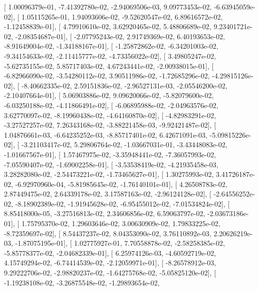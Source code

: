 \documentclass{article}
\begin{document}
       [  1.00096379e-01,  -7.41392780e-02,  -2.94069506e-03,
          9.09773453e-02,  -6.63945059e-02],
       [  1.05115265e-01,   1.94093606e-02,  -9.52620547e-02,
          6.89616572e-02,  -1.12458839e-01],
       [  4.79910610e-02,   3.62920465e-02,   5.48806689e-02,
          9.23401721e-02,  -2.08354687e-01],
       [ -2.07795243e-02,   2.91749369e-02,   6.40193653e-02,
         -8.91649004e-02,  -1.34188167e-01],
       [ -1.25872862e-02,  -6.34201003e-02,  -9.34154633e-02,
         -2.11415777e-02,  -4.73356022e-02],
       [  3.49805247e-02,  -5.62735155e-02,   5.85717403e-02,
          4.67243441e-02,  -2.00938015e-01],
       [ -6.82966090e-02,  -3.54280112e-02,   3.90511986e-02,
         -1.72685296e-02,  -4.29815126e-02],
       [ -8.40662335e-02,   2.59151836e-02,  -2.96527131e-03,
         -2.05546200e-02,  -2.10407664e-01],
       [  5.06903886e-02,   9.09620066e-02,  -5.82079600e-02,
         -6.03250188e-02,  -4.11866491e-02],
       [ -6.06895988e-02,  -2.04963576e-02,   3.62770097e-02,
         -8.19960438e-02,  -4.64160870e-02],
       [ -4.82983291e-02,  -3.27527257e-02,   7.26343168e-02,
         -3.88221458e-03,  -9.92421487e-02],
       [  1.04876661e-03,  -6.64235252e-03,  -8.85717401e-02,
          6.42671091e-03,  -5.09815226e-02],
       [ -3.21103417e-02,   5.29806764e-02,  -1.03667031e-01,
         -3.43448083e-02,  -1.01667567e-01],
       [  1.57467975e-02,  -3.35948441e-02,  -7.36057993e-02,
         -7.05590407e-02,  -1.69002258e-01],
       [ -3.53538419e-02,  -4.21935458e-03,   3.28282080e-02,
         -2.54473221e-02,  -1.73465627e-01],
       [  1.30275993e-02,   3.41726187e-02,  -6.92970960e-04,
         -5.81985645e-02,  -1.76140101e-01],
       [  4.26508783e-02,   2.87449475e-02,   2.64339178e-02,
          3.17587163e-02,  -2.96124128e-02],
       [ -2.64556252e-02,  -8.18902389e-02,  -1.91945628e-02,
         -6.95455012e-02,  -7.01534824e-02],
       [  8.85418000e-05,  -3.27516813e-02,   2.34606856e-02,
          6.59063797e-02,  -2.03673186e-01],
       [  1.75795370e-02,   1.29603646e-02,   3.00630909e-02,
          1.79833225e-02,  -8.72359697e-02],
       [  8.54437237e-02,   8.04353090e-02,   3.76110892e-03,
          2.20626219e-03,  -1.87075195e-01],
       [  1.02775927e-01,   7.70558878e-02,  -2.58258385e-02,
         -5.85778377e-02,  -2.04682339e-01],
       [  6.25974126e-03,  -4.60592719e-02,   4.15749294e-02,
         -6.74414539e-02,  -2.12059971e-01],
       [ -8.26578912e-03,   9.29222706e-02,  -2.98820237e-02,
         -1.64275768e-02,  -5.05825120e-02],
       [ -1.19238108e-02,  -3.26875548e-02,  -1.29893654e-02,
\end{document}
